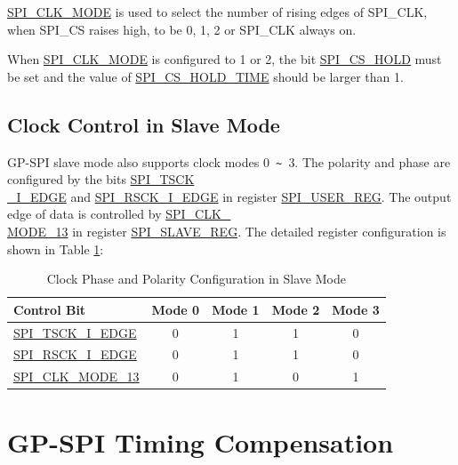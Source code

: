 \documentclass[main\_\_EN.tex]{subfiles}
\begin{document}
\hyperref[fielddesc:SPICLKMODE]{SPI\_CLK\_MODE} is used to select the number of rising edges of SPI\_CLK, when SPI\_CS raises high, to be 0, 1, 2 or SPI\_CLK always on.

\begin{tiplisting}
When \hyperref[fielddesc:SPICLKMODE]{SPI\_CLK\_MODE} is configured to 1 or 2, the bit \hyperref[fielddesc:SPICSHOLD]{SPI\_CS\_HOLD} must be set and the value of \hyperref[fielddesc:SPICSHOLDTIME]{SPI\_CS\_HOLD\_TIME} should be larger than 1.
\end{tiplisting}
\vspace{-1em}

\subsection{Clock Control in Slave Mode}\label{GP-SPI slave clock control}

GP-SPI slave mode also supports clock modes 0\verb+ ~ +3. The polarity and phase are configured by the bits \hyperref[fielddesc:SPITSCKIEDGE]{SPI\_TSCK\\\_I\_EDGE} and \hyperref[fielddesc:SPIRSCKIEDGE]{SPI\_RSCK\_I\_EDGE} in register \hyperref[regdesc:SPIUSERREG]{SPI\_USER\_REG}. The output edge of data is controlled by \hyperref[fielddesc:SPICLKMODE13]{SPI\_CLK\_\\MODE\_13} in register \hyperref[regdesc:SPISLAVEREG]{SPI\_SLAVE\_REG}. The detailed register configuration is shown in Table \ref{table:clock_pol_slave}:

\begin{table}[H]
    \centering
    \caption{Clock Phase and Polarity Configuration in Slave Mode}
    \label{table:clock_pol_slave}
    \begin{tabular}[c]{|p{3.5cm}|c|c|c|c|}
    \hline
    \rowcolor{lightgray}
    \textbf{Control Bit} & \textbf{Mode 0} & \textbf{Mode 1} & \textbf{Mode 2} & \textbf{Mode 3}\\
    \hline
    \hyperref[fielddesc:SPITSCKIEDGE]{SPI\_TSCK\_I\_EDGE}   & 0 & 1 & 1 & 0\\
    \hline
    \hyperref[fielddesc:SPIRSCKIEDGE]{SPI\_RSCK\_I\_EDGE}   & 0 & 1 & 1 & 0\\
    \hline
    \hyperref[fielddesc:SPICLKMODE13]{SPI\_CLK\_MODE\_13}     & 0 & 1 & 0 & 1\\
    \hline
    \end{tabular}
\end{table}


\section{GP-SPI Timing Compensation} \label{sec:gp-spi-timing-compensation}
\end{document}
